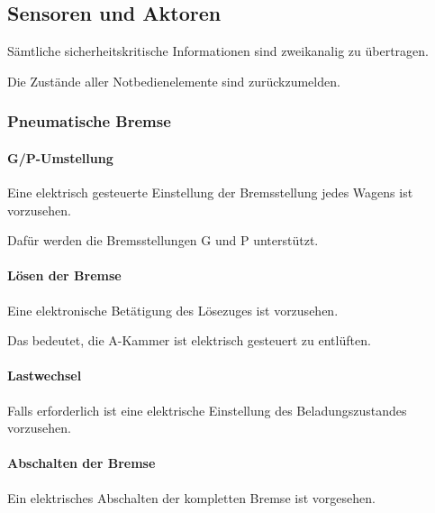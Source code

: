 \subsection{Sensoren und Aktoren}
\begin{feat}
Sämtliche sicherheitskritische Informationen sind zweikanalig zu übertragen.
\end{feat}
\begin{feat}
Die Zustände aller Notbedienelemente sind zurückzumelden.
\end{feat}

\subsubsection{Pneumatische Bremse}
\paragraph{G/P-Umstellung}
\begin{feat}
Eine elektrisch gesteuerte Einstellung der Bremsstellung jedes Wagens ist vorzusehen.
\end{feat}
\begin{rem} [zu Anf. 19]
Dafür werden die Bremsstellungen G und P unterstützt.
\end{rem}

\paragraph{Lösen der Bremse}
\begin{feat}
Eine elektronische Betätigung des Lösezuges ist vorzusehen.
\end{feat}
\begin{rem}[zu Anf. 20]
Das bedeutet, die A-Kammer ist elektrisch gesteuert zu entlüften.
\end{rem}

\paragraph{Lastwechsel}
\begin{feat}
Falls erforderlich ist eine elektrische Einstellung des Beladungszustandes vorzusehen.
\end{feat}

\paragraph{Abschalten der Bremse}
\begin{feat}
Ein elektrisches Abschalten der kompletten Bremse ist vorgesehen.
\end{feat}

